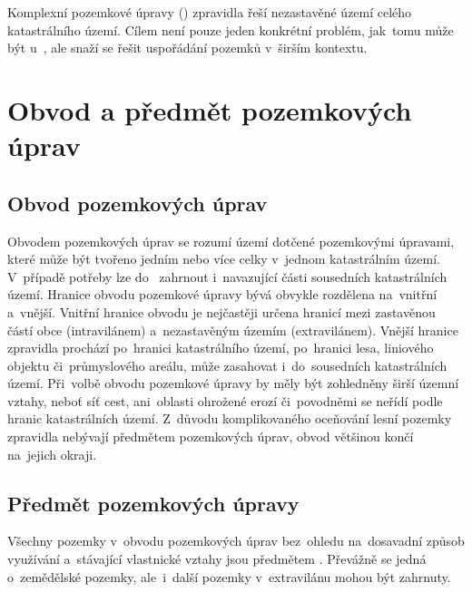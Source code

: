 Komplexní pozemkové úpravy () zpravidla řeší nezastavěné
území celého kata\-strálního území. Cílem  není pouze jeden
konkrétní problém, jak~tomu může být u~, ale snaží se
řešit uspořádání pozemků v~širším kontextu.

\section{Obvod a předmět pozemkových úprav}
\label{obvod_a_predmet_pu}

\subsection{Obvod pozemkových úprav}
\label{obvod_pu}

Obvodem pozemkových úprav se rozumí území dotčené pozemkovými
úpra\-vami, které může být tvořeno jedním nebo více celky v~jednom
katastrálním území. V~pří\-padě potřeby lze do~ zahrnout
i~navazující části sousedních katastrálních území. Hranice obvodu
pozemkové úpravy bývá obvykle rozdělena na~vnitřní a~vnější. Vnitřní
hranice obvodu je nejčastěji určena hranicí mezi zastavěnou částí obce
(intravilánem) a~nezastavěným územím (extravilánem). Vnější hranice
zpravidla pro\-chází po~hranici katastrálního území, po~hranici lesa,
liniového objektu či~průmy\-slového areálu, může zasahovat
i~do~sousedních katastrálních území. Při~volbě obvodu pozemkové úpravy
by měly být zohledněny širší územní vztahy, neboť síť cest,
ani~oblasti ohrožené erozí či~povodněmi se neřídí podle hranic
katastrálních území. Z~důvodu komplikovaného oceňování lesní pozemky
zpravidla nebývají předmětem pozemkových úprav, obvod většinou končí
na~jejich okraji.

\subsection{Předmět pozemkových úpravy}
\label{predmet_pu}

Všechny pozemky v~obvodu pozemkových úprav bez~ohledu na~dosavadní
způsob využívání a~stávající vlastnické vztahy jsou předmětem
. Převážně se jedná o~zemědělské pozemky, ale~i~další pozemky
v~extravilánu mohou být zahrnuty.

